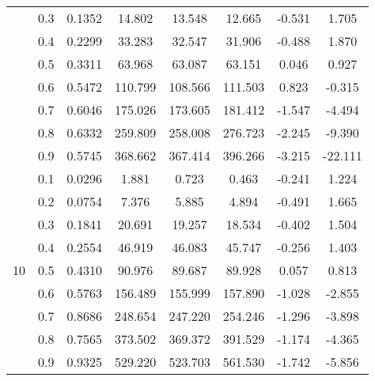 \documentclass[11pt,a4paper]{report}
\begin{document}
\begin{longtable}{ | c | c || c | c | c | c | c | c | }
 & 0.3 & 0.1352 & 14.802 & 13.548 & 12.665 & -0.531 & 1.705 \\
 & 0.4 & 0.2299 & 33.283 & 32.547 & 31.906 & -0.488 & 1.870 \\
 & 0.5 & 0.3311 & 63.968 & 63.087 & 63.151 & 0.046 & 0.927 \\
 & 0.6 & 0.5472 & 110.799 & 108.566 & 111.503 & 0.823 & -0.315 \\
 & 0.7 & 0.6046 & 175.026 & 173.605 & 181.412 & -1.547 & -4.494 \\
 & 0.8 & 0.6332 & 259.809 & 258.008 & 276.723 & -2.245 & -9.390 \\
 & 0.9 & 0.5745 & 368.662 & 367.414 & 396.266 & -3.215 & -22.111 \\
 \hline
\multirow{9}{*}{10} & 0.1 & 0.0296 & 1.881 & 0.723 & 0.463 & -0.241 & 1.224 \\
 & 0.2 & 0.0754 & 7.376 & 5.885 & 4.894 & -0.491 & 1.665 \\
 & 0.3 & 0.1841 & 20.691 & 19.257 & 18.534 & -0.402 & 1.504 \\
 & 0.4 & 0.2554 & 46.919 & 46.083 & 45.747 & -0.256 & 1.403 \\
 & 0.5 & 0.4310 & 90.976 & 89.687 & 89.928 & 0.057 & 0.813 \\
 & 0.6 & 0.5763 & 156.489 & 155.999 & 157.890 & -1.028 & -2.855 \\
 & 0.7 & 0.8686 & 248.654 & 247.220 & 254.246 & -1.296 & -3.898 \\
 & 0.8 & 0.7565 & 373.502 & 369.372 & 391.529 & -1.174 & -4.365 \\
 & 0.9 & 0.9325 & 529.220 & 523.703 & 561.530 & -1.742 & -5.856 \\
 \hline
\hline
\end{longtable}
\end{document}
